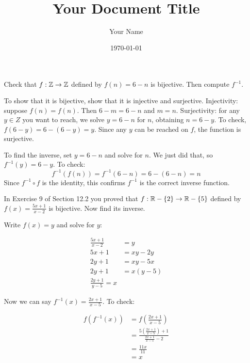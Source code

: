 \documentclass{article}
\title{Your Document Title}
\author{Your Name}
\date{\today} %
\begin{document}
\maketitle
\begin{problem}
Check that $f: \mathbb{Z} \to \mathbb{Z}$ defined by $f(n) = 6 - n$ is bijective. Then compute $f^{-1}$.
\end{problem}

To show that it is bijective, show that it is injective and surjective. Injectivity: suppose $f(n) = f(n)$. Then $6 - m = 6 - n$ and $m = n$. Surjectivity: for any $y \in Z$ you want to reach, we solve $y = 6 - n$ for $n$, obtaining $n = 6 -y$. To check, $f(6 - y) = 6 - (6 - y) = y$. Since any $y$ can be reached on $f$, the function is surjective.

To find the inverse, set $y = 6 - n$ and solve for $n$. We just did that, so $f^{-1}(y) = 6 - y$. To check:
$$f^{-1}(f(n)) = f^{-1}(6 - n) = 6 - (6 - n) = n$$
Since $f^{-1} \circ f$ is the identity, this confirms $f^{-1}$ is the correct inverse function.

\begin{problem}
In Exercise 9 of Section 12.2 you proved that $f: \mathbb{R} - \{2\} \to \mathbb{R} - \{5\}$ defined by $f(x) = \frac{5x + 1}{x -2}$ is bijective. Now find its inverse.
\end{problem}


Write $f(x) = y$ and solve for $y$:

\begin{align*}
  \frac{5x + 1}{x - 2} & = y       \\
  5x + 1               & = xy - 2y \\
  2y + 1               & = xy - 5x \\
  2y + 1               & = x(y-5)  \\
  \frac{2y + 1}{y - 5} = x
\end{align*}

Now we can say $f^{-1}(x) = \frac{2x + 1}{x - 5}$. To check:

\begin{align*}
  f(f^{-1}(x)) & = f\left(\frac{2x + 1}{x - 5}\right)                                    \\
               & = \frac{5\left(\frac{2x + 1}{x - 5}\right) + 1}{\frac{2x + 1}{x - 5}-2} \\
               & = \frac{11x}{11}                                                        \\
               & = x
\end{align*}
\end{document}
